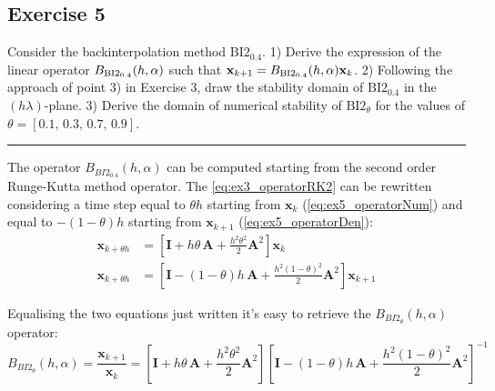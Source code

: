 \documentclass[11pt,a4paper,oneside]{article}
\renewcommand{\vec}[1]{\mathbf{#1}}
\begin{document}
\clearpage
\subsection{Exercise 5}
Consider the backinterpolation method $\textrm{BI2}_{0.4}$. 1) Derive the expression of the linear operator $B_{\rm BI2_{0.4}}(h,\alpha)$ such that $\vec x_{k+1} = B_{\rm BI2_{0.4}}(h,\alpha) \vec x_k$. 2) Following the approach of point 3) in Exercise 3, draw the stability domain of $\textrm{BI2}_{0.4}$ in the $(h\lambda)$-plane. 3) Derive the domain of numerical stability of $\textrm{BI2}_{\theta}$ for the values of $\theta = [0.1,\, 0.3,\, 0.7,\, 0.9]$.

\medskip \hrule \medskip

The operator $B_{BI2_{0.4}}(h,\alpha)$ can be computed starting from the second order Runge-Kutta method operator.
The \cref{eq:ex3_operatorRK2} can be rewritten considering a time step equal to $\theta h$ starting from $\vec{x}_k$ (\cref{eq:ex5_operatorNum}) and equal to $-(1-\theta)h$ starting from $\vec{x}_{k+1}$ (\cref{eq:ex5_operatorDen}):
\begin{subequations}
    \begin{align}
        \vec{x}_{k+\theta h} &= \left[ \vec{I} + h \theta\,    \vec{A} + \frac{h^2 \theta^2}{2} \vec{A}^2 \right] \vec{x}_k         \label{eq:ex5_operatorNum}\\
        \vec{x}_{k+\theta h} &= \left[ \vec{I} - (1-\theta)h\, \vec{A} + \frac{h^2 (1-\theta)^2}{2} \vec{A}^2 \right] \vec{x}_{k+1} \label{eq:ex5_operatorDen}
    \end{align}
\end{subequations}

Equalising the two equations just written it's easy to retrieve the $B_{BI2_{\theta}}(h,\alpha)$ operator:
\begin{equation}
    B_{BI2_{\theta}}(h,\alpha) = \frac{\vec{x}_{k+1}}{\vec{x}_k}
                               = \left[ \vec{I} + h \theta\, \vec{A} + \frac{h^2 \theta^2}{2} \vec{A}^2 \right] \left[ \vec{I} - (1-\theta)h\, \vec{A} + \frac{h^2 (1-\theta)^2}{2} \vec{A}^2 \right] ^{-1}
    \label{eq:ex5_operatorBI}
\end{equation}
\end{document}
